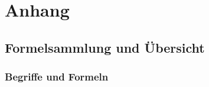 \appendix
\part{Anhang}

\newcommand{\lit}[3]{\vspace{5pt}\noindent\textbf{[#1]} #2\par\nopagebreak\vspace{1pt}{\small\itshape\color{grau} #3}\par\vspace{2pt}}

\chapter{Formelsammlung und Übersicht}

\section{Begriffe und Formeln}

